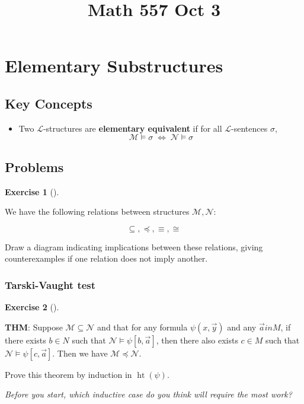 \documentclass[
]{article}
\title{Math 557 Oct 3}
\author{}
\date{}
\providecommand{\tightlist}{%
  \setlength{\itemsep}{0pt}\setlength{\parskip}{0pt}}
\theoremstyle{definition}
\newtheorem{exercise}{Exercise}[section]
\theoremstyle{plain}
\theoremstyle{remark}
\begin{document}
\maketitle


\section{Elementary Substructures}\label{elementary-substructures}

\subsection{Key Concepts}\label{key-concepts}

\begin{itemize}
\tightlist
\item
  Two \(\mathcal{L}\)-structures are \textbf{elementary equivalent} if
  for all \(\mathcal{L}\)-sentences \(\sigma\),
  \[\mathcal{M} \models \sigma \; \iff \; \mathcal{N} \models \sigma\]
\end{itemize}

\subsection{Problems}\label{problems}

\begin{exercise}[]\protect\hypertarget{exr-}{}\label{exr-}

\hfill\break
We have the following relations between structures
\(\mathcal{M}, \mathcal{N}\):

\[\subseteq, \preceq, \equiv, \cong\]

Draw a diagram indicating implications between these relations, giving
counterexamples if one relation does not imply another.

\end{exercise}

\subsubsection{Tarski-Vaught test}\label{tarski-vaught-test}

\begin{exercise}[]\protect\hypertarget{exr-}{}\label{exr-}

\hfill\break
\textbf{THM}: Suppose \(\mathcal{M} \subseteq \mathcal{N}\) and that for
any formula \(\psi(x, \vec{y})\) and any \(\vec{a} in M\), if there
exists \(b \in N\) such that \(\mathcal{N} \models \psi[b, \vec{a}]\),
then there also exists \(c \in M\) such that
\(\mathcal{N} \models \psi[c, \vec{a}]\). Then we have
\(\mathcal{M} \preceq \mathcal{N}\).

Prove this theorem by induction in \(\operatorname{ht}(\psi)\).

\emph{Before you start, which inductive case do you think will require
the most work?}

\end{exercise}
\end{document}
